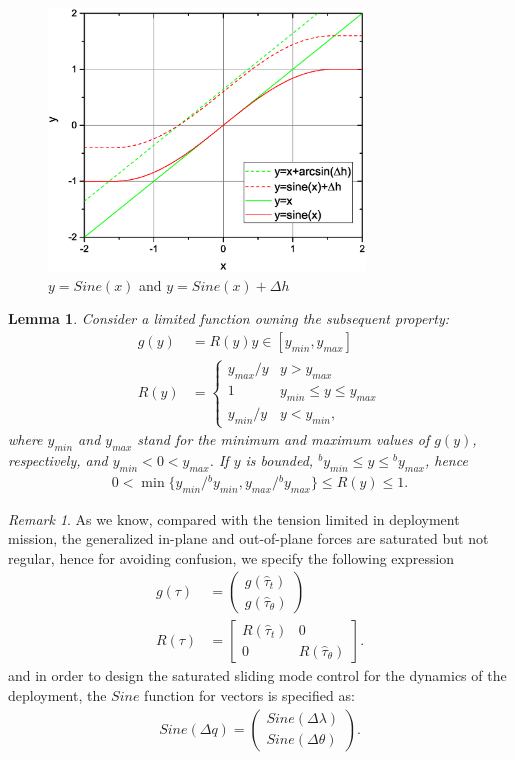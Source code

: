 \documentclass[Journal,letterpaper]{ascelike-new}
\theoremstyle{plain}
\newtheorem{mylem}{Lemma}
\theoremstyle{remark}
\newtheorem{myrem}{Remark}
\begin{document}
\begin{figure}
\centering
\includegraphics[width=0.75\textwidth]{paper4_fig2.eps}
\caption{$y =Sine(x)$ and $y=Sine(x)+\Delta h$}
\label{fig:2}
\end{figure}
\begin{mylem}\label{lemma:2}
Consider a limited function owning the subsequent property:
\begin{align}
g(y) &= R(y)y\in[y_{min},y_{max}]\\
R(y)&=\begin{cases}
y_{max}/y&y>y_{max}\\
1&y_{min}\le y\le y_{max}\\
y_{min}/y&y<y_{min},
\end{cases}
\end{align}
where $y_{min}$ and $y_{max}$ stand for the minimum and maximum values of $g(y)$, respectively, and $y_{min}<0<y_{max}$. If $y$ is bounded, $^by_{min}\le y\le{^by_{max}}$, hence
\begin{align}
0<\min\{y_{min}/{^by_{min}},y_{max}/{^by_{max}}\}\le R(y)\le 1.
\end{align}
\end{mylem}
\begin{myrem}
As we know, compared with the tension limited in deployment mission, the generalized in-plane and out-of-plane forces are saturated but not regular, hence for avoiding confusion, we specify the following expression
\begin{align}
g(\tau) &= \begin{pmatrix}g(\hat\tau_t)\\g(\hat\tau_\theta)\end{pmatrix}\\
R(\tau) &= \begin{bmatrix}R(\hat\tau_t)&0\\0&R(\hat\tau_\theta)\end{bmatrix}.
\end{align}
and in order to design the saturated sliding mode  control for the dynamics of the deployment, the $Sine$ function for vectors is specified as:
\begin{align}
Sine(\Delta q)=\begin{pmatrix}Sine(\Delta \lambda)\\Sine(\Delta\theta)\end{pmatrix}.
\end{align}
\end{myrem}
\end{document}
